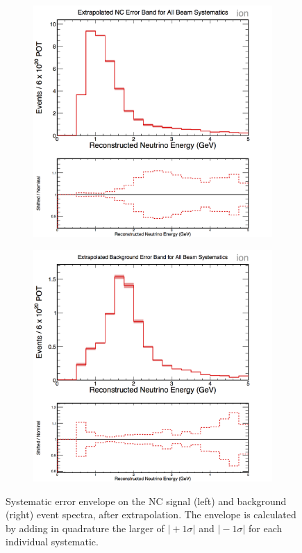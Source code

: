 \begin{figure}[h]
  \centering
  \begin{subfigure}{.48\textwidth}
    \centering
    \includegraphics[width=1\linewidth]{figures/cNCEXBeamSysts.png}
  \end{subfigure}
  \begin{subfigure}{.48\textwidth}
    \centering
    \includegraphics[width=1\linewidth]{figures/cBGEXBeamSysts.png}
  \end{subfigure}
  \caption[Beam Systematic Error Envelopes]{Systematic error envelope on the NC signal (left) and background (right) event spectra, after extrapolation. The envelope is calculated by adding in quadrature the larger of $\vert +1\sigma \vert$ and $\vert -1\sigma \vert$ for each individual systematic.}
  \label{fig:SystBeam}
\end{figure}

